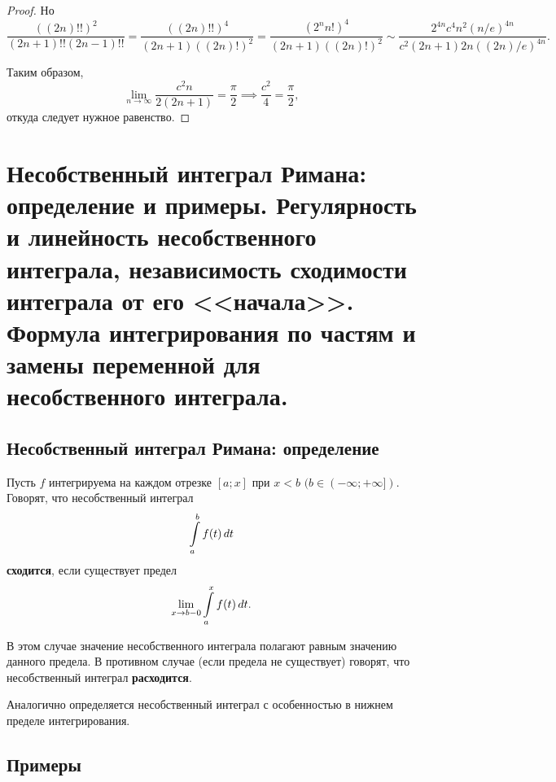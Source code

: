 \documentclass[a4paper]{article}
\theoremstyle{named}
\renewcommand{\int}{\intop}
\begin{document}
\begin{proof}
   			Но
   			\begin{equation*}
   				\dfrac{((2n)!!)^2}{(2n + 1)!!(2n - 1)!!} = \dfrac{((2n)!!)^4}{(2n + 1)((2n)!)^2} = \dfrac{(2^n n!)^4}{(2n + 1)((2n)!)^2} \sim \dfrac{2^{4n}c^4n^2(n / e)^{4n}}{c^2(2n + 1)2n((2n)/e)^{4n}}.
   			\end{equation*}

   			Таким образом,
   			\begin{equation*}
   				\lim_{n \to \infty} \dfrac{c^2n}{2(2n + 1)} = \dfrac{\pi}{2} \implies \dfrac{c^2}{4} = \dfrac{\pi}{2},
   			\end{equation*}
   			откуда следует нужное равенство.
   		\end{proof}

    \section{Несобственный интеграл Римана: определение и примеры. Регулярность и линейность несобственного интеграла, независимость сходимости интеграла от его <<начала>>. Формула интегрирования по частям и замены переменной для несобственного интеграла.}

    	\subsection{Несобственный интеграл Римана: определение}

    	\begin{definition*}
    		Пусть $f$ интегрируема на каждом отрезке $[a; x]$ при $x < b$ $(b \in (-\infty; +\infty])$.
    		Говорят, что несобственный интеграл
    		\begin{equation*}
    			\int_a^b f(t) \dd t
    		\end{equation*}
    		\textbf{сходится}, если существует предел
    		\begin{equation*}
    			\lim_{x \to b - 0} \int_a^x f(t) \dd t.
    		\end{equation*}

    		В этом случае значение несобственного интеграла полагают равным значению данного предела. В противном случае (если предела не существует) говорят, что несобственный интеграл \textbf{расходится}.

    		Аналогично определяется несобственный интеграл с особенностью в нижнем пределе интегрирования.
    	\end{definition*}

    	\subsection{Примеры}
\end{document}
